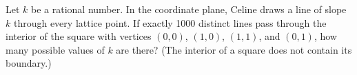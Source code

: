 Let $k$ be a rational number. In the coordinate plane, Celine draws a line of slope $k$ through every lattice point. If exactly 1000 distinct lines pass through the interior of the square with vertices $(0, 0)$, $(1, 0)$, $(1, 1)$, and $(0, 1)$, how many possible values of $k$ are there? (The interior of a square does not  contain its boundary.)
